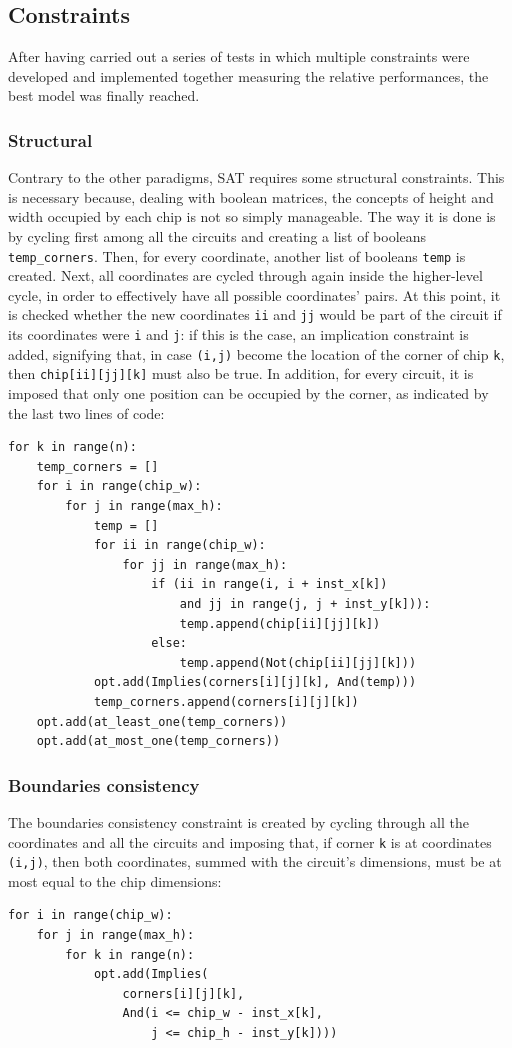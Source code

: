 \documentclass[a4paper, 12pt]{article}
\begin{document}
\subsection{Constraints}
After having carried out a series of tests in which multiple constraints were developed and implemented together measuring the relative performances, the best model was finally reached.

\subsubsection{Structural}
Contrary to the other paradigms, SAT requires some structural constraints. This is necessary because, dealing with boolean matrices, the concepts of height and width occupied by each chip is not so simply manageable. The way it is done is by cycling first among all the circuits and creating a list of booleans \verb|temp_corners|. Then, for every coordinate, another list of booleans \verb|temp| is created. Next, all coordinates are cycled through again inside the higher-level cycle, in order to effectively have all possible coordinates' pairs. At this point, it is checked whether the new coordinates \verb|ii| and \verb|jj| would be part of the circuit if its coordinates were \verb|i| and \verb|j|: if this is the case, an implication constraint is added, signifying that, in case \verb|(i,j)| become the location of the corner of chip \verb|k|, then \verb|chip[ii][jj][k]| must also be true. In addition, for every circuit, it is imposed that only one position can be occupied by the corner, as indicated by the last two lines of code:
\begin{verbatim}
for k in range(n):
    temp_corners = []
    for i in range(chip_w):
        for j in range(max_h):
            temp = []
            for ii in range(chip_w):
                for jj in range(max_h):
                    if (ii in range(i, i + inst_x[k])
                        and jj in range(j, j + inst_y[k])):
                        temp.append(chip[ii][jj][k])
                    else:
                        temp.append(Not(chip[ii][jj][k]))
            opt.add(Implies(corners[i][j][k], And(temp)))
            temp_corners.append(corners[i][j][k])
    opt.add(at_least_one(temp_corners))
    opt.add(at_most_one(temp_corners))
\end{verbatim}


\subsubsection{Boundaries consistency}
The boundaries consistency constraint is created by cycling through all the coordinates and all the circuits and imposing that, if corner \verb|k| is at coordinates \verb|(i,j)|, then both coordinates, summed with the circuit's dimensions, must be at most equal to the chip dimensions:
\begin{verbatim}
for i in range(chip_w):
    for j in range(max_h):
        for k in range(n):
            opt.add(Implies(
                corners[i][j][k],
                And(i <= chip_w - inst_x[k],
                    j <= chip_h - inst_y[k])))
\end{verbatim}
\end{document}
